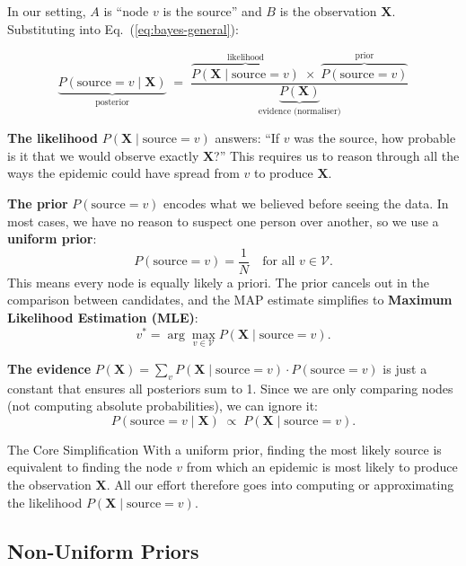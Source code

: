 In our setting, $A$ is ``node $v$ is the source'' and $B$ is the observation
$\mathbf{X}$. Substituting into Eq.~(\ref{eq:bayes-general}):

\begin{equation}
    \underbrace{P(\text{source}=v \mid \mathbf{X})}_{\text{posterior}}
    \;=\;
    \frac{
        \overbrace{P(\mathbf{X} \mid \text{source}=v)}^{\text{likelihood}}
        \;\times\;
        \overbrace{P(\text{source}=v)}^{\text{prior}}
    }{
        \underbrace{P(\mathbf{X})}_{\text{evidence (normaliser)}}
    }
    \label{eq:bayes-source}
\end{equation}

\textbf{The likelihood} $P(\mathbf{X} \mid \text{source}=v)$ answers:
``If $v$ was the source, how probable is it that we would observe exactly
$\mathbf{X}$?'' This requires us to reason through all the ways the epidemic
could have spread from $v$ to produce $\mathbf{X}$.

\textbf{The prior} $P(\text{source}=v)$ encodes what we believed before
seeing the data. In most cases, we have no reason to suspect one person over
another, so we use a \textbf{uniform prior}:
\[
    P(\text{source}=v) = \frac{1}{N} \quad \text{for all } v \in \mathcal{V}.
\]
This means every node is equally likely a priori. The prior cancels out in
the comparison between candidates, and the MAP estimate simplifies to
\textbf{Maximum Likelihood Estimation (MLE)}:
\[
    v^* = \arg\max_{v \in \mathcal{V}} P(\mathbf{X} \mid \text{source}=v).
\]

\textbf{The evidence} $P(\mathbf{X}) = \sum_{v} P(\mathbf{X} \mid
\text{source}=v) \cdot P(\text{source}=v)$ is just a constant that ensures
all posteriors sum to 1. Since we are only comparing nodes (not computing
absolute probabilities), we can ignore it:
\[
    P(\text{source}=v \mid \mathbf{X})
    \;\propto\;
    P(\mathbf{X} \mid \text{source}=v).
\]

\begin{keyinsight}{The Core Simplification}
With a uniform prior, finding the most likely source is equivalent to finding
the node $v$ from which an epidemic is most likely to produce the
observation $\mathbf{X}$. All our effort therefore goes into computing or
approximating the likelihood $P(\mathbf{X} \mid \text{source}=v)$.
\end{keyinsight}

\subsection{Non-Uniform Priors}

